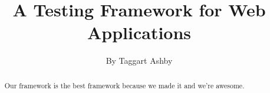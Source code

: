 \documentclass[11pt]{article}
\begin{document}

\title{\vfill A Testing Framework for Web Applications} %
\author{
By Taggart Ashby \vspace{10pt} \\
}

\maketitle

\vfill  %

\begin{abstract}
Our framework is the best framework because we made it and we're awesome.
\end{abstract}

\thispagestyle{empty} %
\newpage


\setcounter{page}{1}

\end{document}
